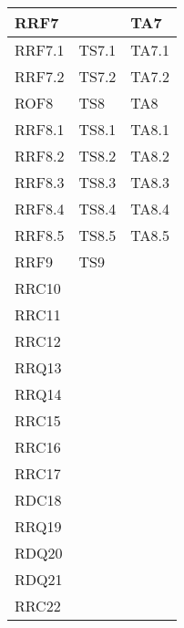 \begin{longtabu}{| X | X | X |}
				RRF7 	&		&	TA7 	\\ \hline
				RRF7.1 	&	TS7.1 	&	TA7.1 	\\ \hline
				RRF7.2 	&	TS7.2 	&	TA7.2 	\\ \hline
				ROF8 	&	TS8 	&	TA8 	\\ \hline
				RRF8.1 	&	TS8.1 	&	TA8.1 	\\ \hline
				RRF8.2 	&	TS8.2 	&	TA8.2 	\\ \hline
				RRF8.3 	&	TS8.3 	&	TA8.3 	\\ \hline
				RRF8.4 	&	TS8.4 	&	TA8.4 	\\ \hline
				RRF8.5 	&	TS8.5 	&	TA8.5 	\\ \hline
				RRF9 	&	TS9 	&		\\ \hline
				RRC10 	&		&		\\ \hline
				RRC11 	&		&		\\ \hline
				RRC12 	&		&		\\ \hline
				RRQ13 	&		&		\\ \hline
				RRQ14 	&		&		\\ \hline
				RRC15 	&		&		\\ \hline
				RRC16 	&		&		\\ \hline
				RRC17 	&		&		\\ \hline
				RDC18 	&		&		\\ \hline
				RRQ19 	&		&		\\ \hline
				RDQ20 	&		&		\\ \hline
				RDQ21 	&		&		\\ \hline
				RRC22 	&		&		\\ \hline

\end{longtabu}
